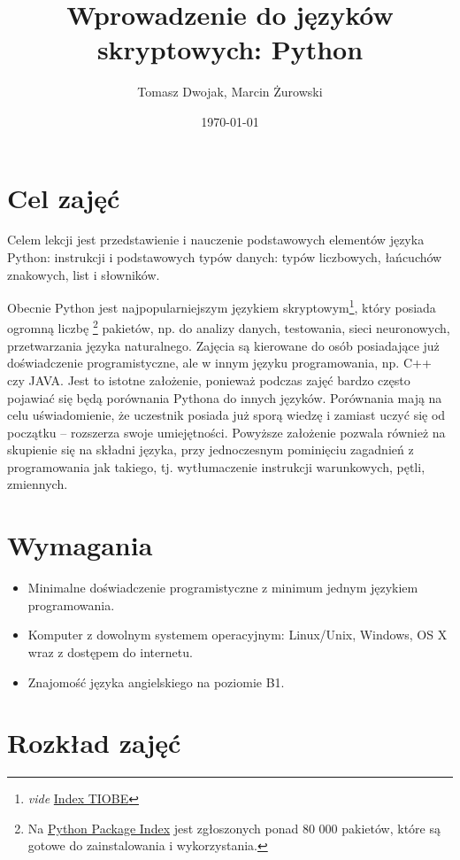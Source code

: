 \documentclass{mwart}
\author{Tomasz Dwojak, Marcin Żurowski}
\title{Wprowadzenie do języków skryptowych: Python}
\date{\today}
\begin{document}
\maketitle

\section{Cel zajęć}
Celem lekcji jest przedstawienie i nauczenie podstawowych elementów języka Python:
instrukcji i podstawowych typów danych: typów liczbowych, łańcuchów znakowych, list i
słowników.

Obecnie Python jest najpopularniejszym językiem skryptowym\footnote{\emph{vide}
  \href{http://www.tiobe.com/tiobe_index}{Index TIOBE}}, który posiada
ogromną liczbę \footnote{Na \href{https://pypi.python.org/pypi}{Python Package Index} jest
  zgłoszonych ponad 80 000 pakietów, które są gotowe do zainstalowania i wykorzystania.} pakietów, np. do
analizy danych, testowania, sieci neuronowych, przetwarzania języka naturalnego.
Zajęcia są kierowane do osób posiadające już doświadczenie programistyczne, ale w innym
języku programowania, np. C++ czy JAVA. Jest to istotne założenie, ponieważ podczas zajęć bardzo
często pojawiać się będą porównania Pythona do innych języków. Porównania mają na celu
uświadomienie, że uczestnik posiada już sporą wiedzę i zamiast uczyć się od początku --
rozszerza swoje umiejętności. Powyższe założenie
pozwala również na skupienie się na składni języka, przy jednoczesnym pominięciu zagadnień z
programowania jak takiego, tj. wytłumaczenie instrukcji warunkowych, pętli, zmiennych.

\section{Wymagania}
\begin{itemize}
  \item Minimalne doświadczenie programistyczne z minimum jednym językiem programowania.
  \item Komputer z dowolnym systemem operacyjnym: Linux/Unix, Windows, OS X wraz z
    dostępem do internetu.
  \item Znajomość języka angielskiego na poziomie B1.
\end{itemize}

\section{Rozkład zajęć}
\end{document}
